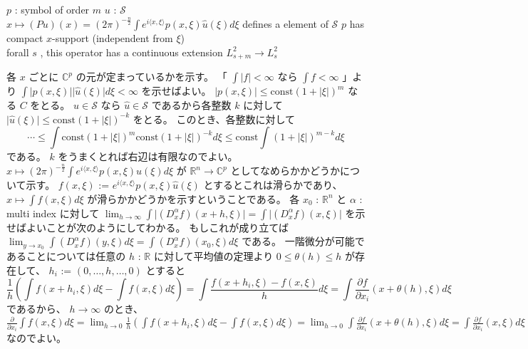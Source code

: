 \begin{Theorem}
\itemwhen
  \Fix \(p\) : symbol of order \(m\)
\itemprop
  \For \(u\) : \(\mathscr{S}\) \\
  \Then \(x \mapsto (Pu) (x) = (2\pi)^{-\frac{n}{2}} \int e^{i \langle x , \xi \rangle} p(x , \xi) \hat{u}(\xi) d \xi\) defines a element of \(\mathscr{S}\)
\itemprop
  \IfHold \(p\) has compact \(x\)-support (independent from \(\xi\)) \\
  \Then forall \(s\) , this operator has a continuous extension \(L^2_{s+m} \to L^2_s\)
\end{Theorem}

\begin{Proof}
\itemprof
  各 \(x\) ごとに \(\mathbb{C}^p\) の元が定まっているかを示す。
  「 \(\int \lvert f \rvert < \infty\) なら \(\int f < \infty\) 」より \(\int \lvert p(x ,\xi) \rvert \lvert \hat{u}(\xi) \rvert d \xi < \infty\) を示せばよい。
  \(\lvert p(x,\xi) \rvert \leq \text{const} (1 + \lvert \xi \rvert)^m\) なる \(C\) をとる。
  \(u \in \mathscr{S}\) なら \(\hat{u} \in \mathscr{S}\) であるから各整数 \(k\) に対して \(\lvert \hat{u}(\xi) \rvert \leq \text{const} (1 + \lvert \xi \rvert)^{-k}\) をとる。
  このとき、各整数に対して
  \[
    \cdots \leq \int \text{const} (1 + \lvert \xi \rvert)^{m} \text{const} (1 + \lvert \xi \rvert)^{-k} d \xi \leq \text{const} \int (1 + \lvert \xi \rvert)^{m - k} d\xi
  \]
  である。
  \(k\) をうまくとれば右辺は有限なのでよい。
\itemthen
  \(x \mapsto (2\pi)^{-\frac{n}{2}} \int e^{i \langle x , \xi \rangle} p(x , \xi) \hat{u}(\xi) d \xi\) が \(\mathbb{R}^n \to \mathbb{C}^p\) としてなめらかかどうかについて示す。
  \(f(x,\xi)\) := \(e^{i\langle x , \xi \rangle} p(x,\xi) \hat{u}(\xi)\) とするとこれは滑らかであり、 \(x \mapsto \int f(x,\xi) d\xi\) が滑らかかどうかを示すということである。
  各 \(x_0\) : \(\mathbb{R}^n\) と \(\alpha\) : multi index に対して \(\lim_{h \to \infty} \int \lvert (D^\alpha_x f)(x + h ,\xi) \rvert = \int \lvert (D^\alpha_x f)(x , \xi) \rvert \) を示せばよいことが次のようにしてわかる。
  もしこれが成り立てば \(\lim_{y \to x_0} \int (D^\alpha_x f)(y , \xi) d\xi = \int (D^\alpha_x f)(x_0 , \xi) d\xi\) である。
  一階微分が可能であることについては任意の \(h\) : \(\mathbb{R}\) に対して平均値の定理より \(0 \leq \theta (h) \leq h\) が存在して、 \(h_i\) := \((0 , \ldots , h , \ldots , 0)\) とすると
  \[\frac{1}{h}(\int f(x + h_i ,\xi) d\xi - \int f(x , \xi) d\xi) = \int \frac{f(x + h_i , \xi) - f(x , \xi)}{h} d\xi = \int \frac{\partial f}{\partial x_i} (x + \theta (h) , \xi) d\xi\]
  であるから、 \(h \to \infty\) のとき、
  \(\frac{\partial}{\partial x_i} \int f(x,\xi) d\xi = \lim_{h \to 0} \frac{1}{h}(\int f(x + h_i ,\xi) d\xi - \int f(x , \xi) d\xi) = \lim_{h \to 0} \int \frac{\partial f}{\partial x_i}(x + \theta(h) , \xi) d\xi = \int \frac{\partial f}{\partial x_i}(x , \xi) d\xi\) なのでよい。

\end{Proof}
